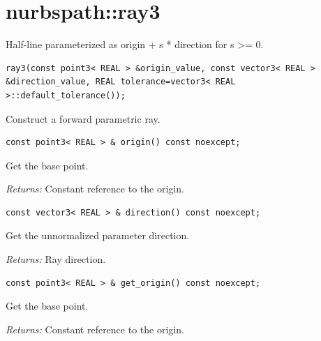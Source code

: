 \section{nurbspath::ray3}
Half-line parameterized as origin + s * direction for s >= 0.
\par\noindent\begin{minipage}{\linewidth}
\begin{lstlisting}[style=apireference]
ray3(const point3< REAL > &origin_value, const vector3< REAL > &direction_value, REAL tolerance=vector3< REAL >::default_tolerance());
\end{lstlisting}
{\footnotesize Construct a forward parametric ray.\par}
\end{minipage}\par\vspace{1pt}
\par\noindent\begin{minipage}{\linewidth}
\begin{lstlisting}[style=apireference]
const point3< REAL > & origin() const noexcept;
\end{lstlisting}
{\footnotesize Get the base point.\par}
{\footnotesize\textit{Returns:} Constant reference to the origin.\par}
\end{minipage}\par\vspace{1pt}
\par\noindent\begin{minipage}{\linewidth}
\begin{lstlisting}[style=apireference]
const vector3< REAL > & direction() const noexcept;
\end{lstlisting}
{\footnotesize Get the unnormalized parameter direction.\par}
{\footnotesize\textit{Returns:} Ray direction.\par}
\end{minipage}\par\vspace{1pt}
\par\noindent\begin{minipage}{\linewidth}
\begin{lstlisting}[style=apireference]
const point3< REAL > & get_origin() const noexcept;
\end{lstlisting}
{\footnotesize Get the base point.\par}
{\footnotesize\textit{Returns:} Constant reference to the origin.\par}
\end{minipage}\par\vspace{1pt}
